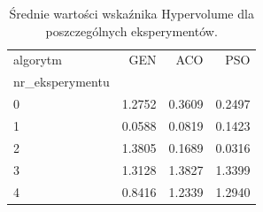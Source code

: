 \begin{table}
\caption{Średnie wartości wskaźnika Hypervolume dla poszczególnych eksperymentów.}
\label{tab:hv_srednie}
\begin{tabular}{lrrr}
\toprule
algorytm & GEN & ACO & PSO \\
nr_eksperymentu &  &  &  \\
\midrule
0 & 1.2752 & 0.3609 & 0.2497 \\
1 & 0.0588 & 0.0819 & 0.1423 \\
2 & 1.3805 & 0.1689 & 0.0316 \\
3 & 1.3128 & 1.3827 & 1.3399 \\
4 & 0.8416 & 1.2339 & 1.2940 \\
\bottomrule
\end{tabular}
\end{table}
